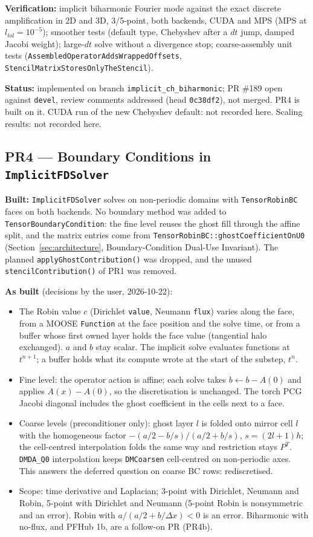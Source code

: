 \documentclass[11pt]{article}
\newcommand{\pr}[2]{\subsection{PR#1 --- #2}}
\newcommand{\status}[1]{\textcolor{marlinteal}{\textbf{Status:}} #1}
\begin{document}
\textbf{Verification:} implicit biharmonic Fourier mode against the exact
discrete amplification in 2D and 3D, 3/5-point, both backends, CUDA and MPS
(MPS at $l_{tol}=10^{-5}$); smoother tests (default type, Chebyshev after a
$dt$ jump, damped Jacobi weight); large-$dt$ solve without a divergence stop;
coarse-assembly unit
tests (\texttt{AssembledOperatorAddsWrappedOffsets},
\texttt{StencilMatrixStoresOnlyTheStencil}).

\status{implemented on branch \texttt{implicit\_ch\_biharmonic}; PR \#189 open against
\texttt{devel}, review comments addressed (head \texttt{0c38df2}), not merged. PR4 is
built on it. CUDA run of the new Chebyshev default: not recorded here. Scaling results:
not recorded here.}

\pr{4}{Boundary Conditions in \texttt{ImplicitFDSolver}}
\textbf{Built:} \texttt{ImplicitFDSolver} solves on non-periodic domains with
\texttt{TensorRobinBC} faces on both backends. No boundary method was added
to \texttt{TensorBoundaryCondition}: the fine level reuses the ghost fill
through the affine split, and the matrix entries come from
\texttt{TensorRobinBC::ghostCoefficientOnU0}
(Section~\ref{sec:architecture}, Boundary-Condition Dual-Use Invariant).
The planned \texttt{applyGhostContribution()} was dropped, and the unused
\texttt{stencilContribution()} of PR1 was removed.

\textbf{As built} (decisions by the user, 2026-10-22):
\begin{itemize}[leftmargin=*]
\item The Robin value $c$ (Dirichlet \texttt{value}, Neumann \texttt{flux}) varies along the
face, from a MOOSE \texttt{Function} at the face position and the solve time, or from a
buffer whose first owned layer holds the face value (tangential halo exchanged). $a$ and
$b$ stay scalar. The implicit solve evaluates functions at $t^{n+1}$; a buffer holds what its compute wrote at the start of the substep, $t^n$.
\item Fine level: the operator action is affine; each solve takes $b \leftarrow b - A(0)$
and applies $A(x) - A(0)$, so the discretisation is unchanged. The torch PCG Jacobi
diagonal includes the ghost coefficient in the cells next to a face.
\item Coarse levels (preconditioner only): ghost layer $l$ is folded onto mirror cell $l$
with the homogeneous factor $-(a/2 - b/s)/(a/2 + b/s)$, $s = (2l+1)h$; the cell-centred
interpolation folds the same way and restriction stays $P^T$. \texttt{DMDA\_Q0}
interpolation keeps \texttt{DMCoarsen} cell-centred on non-periodic axes. This answers the
deferred question on coarse BC rows: rediscretised.
\item Scope: time derivative and Laplacian; 3-point with Dirichlet, Neumann and Robin,
5-point with Dirichlet and Neumann (5-point Robin is nonsymmetric and an error). Robin
with $a/(a/2 + b/\Delta x) < 0$ is an error. Biharmonic with no-flux, and PFHub 1b, are a
follow-on PR (PR4b).
\end{itemize}
\end{document}
